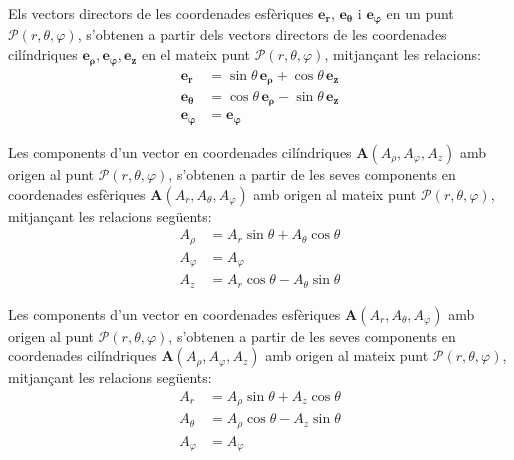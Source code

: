 \documentclass[catalan,a4paper,twoside,11pt]{article}
\begin{document}
Els vectors directors de les coordenades esfèriques  $\boldsymbol{e_r}$, $\boldsymbol{e_\theta}$ i $\boldsymbol{e_\varphi}$ en un punt $\mathscr{P}(r,\theta,\varphi)$, s'obtenen a partir dels vectors directors de les coordenades cilíndriques $\boldsymbol{e_\rho},\boldsymbol{e_\varphi},\boldsymbol{e_z}$ en el mateix punt $\mathscr{P}(r,\theta,\varphi)$, mitjançant les relacions:
\begin{subequations}\begin{align}
    \boldsymbol{e_r} &=\sin\theta\,\boldsymbol{e_\rho}+\cos\theta\,\boldsymbol{e_z}\\
    \boldsymbol{e_\theta}
    &=\cos\theta\,\boldsymbol{e_\rho}-\sin\theta\,\boldsymbol{e_z}\\
    \boldsymbol{e_\varphi}&=\boldsymbol{e_\varphi}
\end{align}\end{subequations}


Les components d'un vector en coordenades cilíndriques  $\boldsymbol{A}(A_\rho, A_\varphi, A_z)$ amb origen al punt $\mathscr{P}(r,\theta,\varphi)$, s'obtenen a partir de les seves components en coordenades esfèriques $\boldsymbol{A}(A_r, A_\theta, A_\varphi)$ amb origen al mateix punt $\mathscr{P}(r,\theta,\varphi)$, mitjançant les relacions següents:
\begin{subequations}\begin{align}
    A_\rho &= A_r\sin\theta+A_\theta\cos\theta \\
    A_\varphi &= A_\varphi\\
    A_z &= A_r\cos\theta-A_\theta\sin\theta
\end{align}\end{subequations}

Les components d'un vector en coordenades esfèriques $\boldsymbol{A}(A_r, A_\theta, A_\varphi)$ amb origen al punt $\mathscr{P}(r,\theta,\varphi)$, s'obtenen a partir de les seves components en coordenades cilíndriques $\boldsymbol{A}(A_\rho, A_\varphi, A_z)$ amb origen al mateix punt $\mathscr{P}(r,\theta,\varphi)$, mitjançant les relacions següents:
\begin{subequations}\begin{align}
    A_r &=  A_\rho\sin\theta+A_z\cos\theta\\
    A_\theta &=  A_\rho\cos\theta-A_z\sin\theta\\
    A_\varphi &= A_\varphi
\end{align}\end{subequations}
\end{document}
